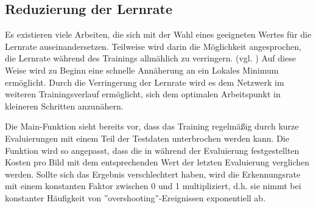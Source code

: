 \documentclass[../main.tex]{subfiles}
\begin{document}
\subsection{Reduzierung der Lernrate}
Es existieren viele Arbeiten, die sich mit der Wahl eines geeigneten Wertes für die Lernrate auseinandersetzen. Teilweise wird darin die Möglichkeit angesprochen, die Lernrate während des Trainings allmählich zu verringern. (vgl. \cite{sparseAutoencoder}) Auf diese Weise wird zu Beginn eine schnelle Annäherung an ein Lokales Minimum ermöglicht. Durch die Verringerung der Lernrate wird es dem Netzwerk im weiteren Trainingsverlauf ermöglicht, sich dem optimalen Arbeitspunkt in kleineren Schritten anzunähern. 

Die Main-Funktion sieht bereits vor, dass das Training regelmäßig durch kurze Evaluierungen mit einem Teil der Testdaten unterbrochen werden kann. Die Funktion wird so angepasst, dass die in während der Evaluierung festgestellten Kosten pro Bild mit dem entsprechenden Wert der letzten Evaluierung verglichen werden. Sollte sich das Ergebnis verschlechtert haben, wird die Erkennungsrate mit einem konstanten Faktor zwischen 0 und 1 multipliziert, d.h. sie nimmt bei konstanter Häufigkeit von ''overshooting''-Ereignissen exponentiell ab. 
\end{document}
